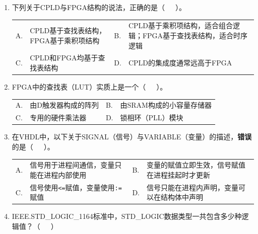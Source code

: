 \begin{enumerate}[label=\arabic*., leftmargin=*]

\item 下列关于CPLD与FPGA结构的说法，正确的是（~~~）。

\vspace{0.3cm}

\begin{tabular}{@{}lp{}@{\qquad}lp{}@{}}
A. & CPLD基于查找表结构，FPGA基于乘积项结构 &
B. & CPLD基于乘积项结构，适合组合逻辑；FPGA基于查找表结构，适合时序逻辑 \\
C. & CPLD和FPGA均基于查找表结构 &
D. & CPLD的集成度通常远高于FPGA \\
\end{tabular}

\vspace{0.8cm}

\item FPGA中的查找表（LUT）实质上是一个（~~~）。

\vspace{0.3cm}

\begin{tabular}{@{}lp{}@{\qquad}lp{}@{}}
A. & 由D触发器构成的阵列 &
B. & 由SRAM构成的小容量存储器 \\
C. & 专用的硬件乘法器 &
D. & 锁相环（PLL）模块 \\
\end{tabular}

\vspace{0.8cm}

\item 在VHDL中，以下关于SIGNAL（信号）与VARIABLE（变量）的描述，\textbf{错误}的是（~~~）。

\vspace{0.3cm}

\begin{tabular}{@{}lp{}@{\qquad}lp{}@{}}
A. & 信号用于进程间通信，变量只能在进程内部使用 &
B. & 变量的赋值立即生效，信号赋值在进程挂起时才更新 \\
C. & 信号使用\verb|<=|赋值，变量使用\verb|:=|赋值 &
D. & 信号只能在进程内声明，变量可以在结构体中声明 \\
\end{tabular}

\vspace{0.8cm}

\item IEEE.STD\_LOGIC\_1164标准中，STD\_LOGIC数据类型一共包含多少种逻辑值？（~~~）


\end{enumerate}
